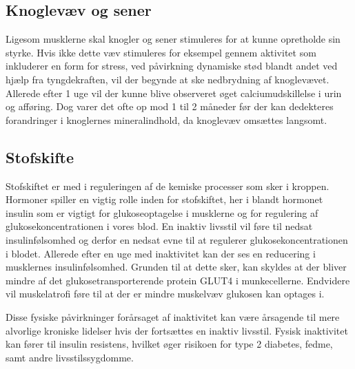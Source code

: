 \subsection{Knoglevæv og sener}
Ligesom musklerne skal knogler og sener stimuleres for at kunne opretholde sin styrke. Hvis ikke dette væv stimuleres for eksempel gennem aktivitet som inkluderer en form for stress, ved påvirkning dynamiske stød blandt andet ved hjælp fra tyngdekraften, vil der begynde at ske nedbrydning af knoglevævet. Allerede efter 1 uge vil der kunne blive observeret øget calciumudskillelse i urin og afføring. Dog varer det ofte op mod 1 til 2 måneder før der kan dedekteres forandringer i knoglernes mineralindhold, da knoglevæv omsættes langsomt. \citep{Bloomfield1995}

\subsection{Stofskifte}
Stofskiftet er med i reguleringen af de kemiske processer som sker i kroppen. Hormoner spiller en vigtig rolle inden for stofskiftet, her i blandt hormonet insulin som er vigtigt for glukoseoptagelse i musklerne og for regulering af glukosekoncentrationen i vores blod. En inaktiv livsstil vil føre til nedsat insulinfølsomhed og derfor en nedsat evne til at regulerer glukosekoncentrationen i blodet. Allerede efter en uge med inaktivitet kan der ses en reducering i musklernes insulinfølsomhed. \citep{Mikines1991} Grunden til at dette sker, kan skyldes at der bliver mindre af det glukosetransporterende protein GLUT4 i munkecellerne. Endvidere vil muskelatrofi føre til at der er mindre muskelvæv glukosen kan optages i. \citep{Tabata1999}

Disse fysiske påvirkninger forårsaget af inaktivitet kan være årsagende til mere alvorlige kroniske lidelser hvis der fortsættes en inaktiv livsstil. Fysisk inaktivitet kan fører til insulin resistens, hvilket øger risikoen for type 2 diabetes, fedme, samt andre livsstilssygdomme. \citep{motionsraad2007}
